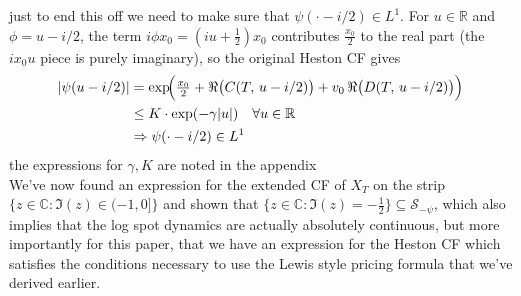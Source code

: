 just to end this off we need to make sure that $\psi(\cdot -i/2)\in L^1$. For $u\in\mathbb{R}$ and $\phi=u-i/2$, the term $i\phi x_0=(iu+\tfrac{1}{2})x_0$ contributes $\tfrac{x_0}{2}$ to the real part (the $ix_0 u$ piece is purely imaginary), so the original Heston CF gives
\begin{align}
  |\psi(u-i/2)|
  &=\exp\!\Bigl(\tfrac{x_0}{2}+\Re\bigl(C(T,\,u-i/2)\bigr)+v_0\,\Re\bigl(D(T,\,u-i/2)\bigr)\Bigr)\\
  &\leq K\cdot\exp(-\gamma|u|)\quad\forall u\in\mathbb{R}\\
  &\Rightarrow \psi(\cdot-i/2)\in L^1
\end{align}
the expressions for $\gamma,K$ are noted in the appendix\\
We've now found an expression for the extended CF of $X_T$ on the strip $\{z\in \mathbb{C}:\Im(z)\in(-1,0]\}$ and shown that $\{z\in \mathbb{C}:\Im(z)=-\frac{1}{2}\}\subseteq \mathcal{S}_{-\psi}$,
which also implies that the log spot dynamics are actually absolutely continuous, but more importantly for this paper, that we have an expression for the Heston CF which satisfies the conditions
necessary to use the Lewis style pricing formula that we've derived earlier.



